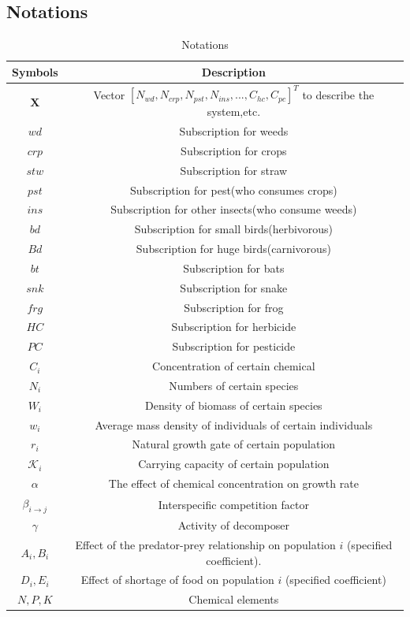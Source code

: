 \documentclass{HZNUMCM}
\begin{document}
        \subsection{Notations}
      \begin{table}[H]
        \centering
        \caption{Notations}
        \begin{tabular}{cc}
          \toprule
          \rowcolor{customcolor!40} %
          Symbols & Description\\
          \midrule
          $\mathbf{X}$ & Vector $[N_{wd},N_{crp},N_{pst},N_{ins},...,C_{hc},C_{pc}]^T$ to describe the system,etc. \\
          $wd$ & Subscription for weeds \\
          $crp$ & Subscription for crops \\
          $stw$ & Subscription for straw \\
          $pst$ & Subscription for pest(who consumes crops) \\
          $ins$ & Subscription for other insects(who consume weeds) \\
          $bd$ & Subscription for small birds(herbivorous) \\
          $Bd$ & Subscription for huge birds(carnivorous) \\
          $bt$ & Subscription for bats \\
          $snk$ & Subscription for snake \\
          $frg$ & Subscription for frog \\
          $HC$ & Subscription for herbicide \\
          $PC$ & Subscription for pesticide \\
          $C_i$ & Concentration of certain chemical \\
          $N_i$ & Numbers of certain species \\
          $W_i$ & Density of biomass of certain species \\
          $w_i$ & Average mass density of individuals of certain individuals \\
          $r_i$ & Natural growth gate of certain population\\
          $\mathscr{K}_i$ & Carrying capacity of certain population\\
          $\alpha$ & The effect of chemical concentration on growth rate\\
          $\beta_{i \rightarrow j}$ & Interspecific competition factor\\
          $\gamma$ & Activity of decomposer\\
          $A_i,B_i$ & Effect of the predator-prey relationship on population $i$ (specified coefficient).\\
          $D_i,E_i$ & Effect of shortage of food on population $i$ (specified coefficient)\\
          $N,P,K$ & Chemical elements\\
          \bottomrule
        \end{tabular}
        \label{tab:Notations}
      \end{table}
\end{document}
